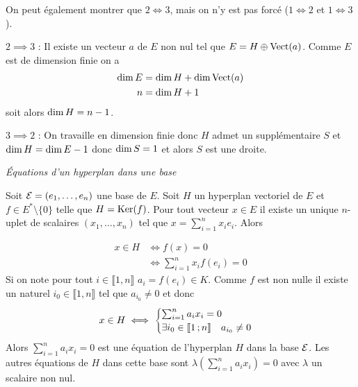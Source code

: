 On peut également montrer que \(2 \iff 3\), mais on n'y est pas forcé (\(1 \iff 2\) et \(1 \iff 3\)).

\(2 \implies 3\) : Il existe un vecteur \(a\) de \(E\) non nul tel que \(E=H \oplus \operatorname{Vect}(a)\). Comme \(E\) est de dimension finie on a
\begin{align}
  \operatorname{dim} E &= \operatorname{dim} H +\operatorname{dim} \operatorname{Vect}(a)\\
  n &= \operatorname{dim} H +1
\end{align}
soit alors \(\operatorname{dim} H = n-1\).

\(3 \implies 2\) : On travaille en dimension finie donc \(H\) admet un supplémentaire \(S\) et \(\operatorname{dim} H = \operatorname{dim} E -1\) donc \(\operatorname{dim} S=1\) et alors \(S\) est une droite.

\emph{Équations d'un hyperplan dans une base}

Soit \(\mathcal{E}=(e_1, \ldots, e_n)\) une base de \(E\). Soit \(H\) un hyperplan vectoriel de \(E\) et \(f \in E^*\setminus\{0\}\) telle que \(H=\operatorname{Ker}(f)\). Pour tout vecteur \(x \in E\) il existe un unique \(n\)-uplet de scalaires \((x_1,\ldots, x_n)\) tel que \(x = \sum_{i=1}^n x_i e_i\). Alors

\begin{align}
  x \in H &\iff f(x)=0\\
          &\iff \sum_{i=1}^n x_i f(e_i)=0
\end{align}
Si on note pour tout \(i \in \llbracket 1,n \rrbracket\) \(a_i=f(e_i) \in K\). Comme \(f\) est non nulle il existe un naturel \(i_0 \in \llbracket 1,n \rrbracket\) tel que \(a_{i_0} \neq 0\) et donc
\begin{equation}
  x \in H \iff
  \begin{cases}
    \sum_{i=1}^n a_i x_i=0 \\ \exists i_0 \in \mathopen{\llbracket}1\mathclose{}\mathpunct{};n\mathclose{\rrbracket} \quad a_{i_0} \neq 0
  \end{cases}
\end{equation}
Alors \(\sum_{i=1}^n a_i x_i=0\) est une équation de l'hyperplan \(H\) dans la base \(\mathcal{E}\). Les autres équations de \(H\) dans cette base sont \(\lambda \left(\sum_{i=1}^n a_i x_i\right)=0\) avec \(\lambda\) un scalaire non nul.

